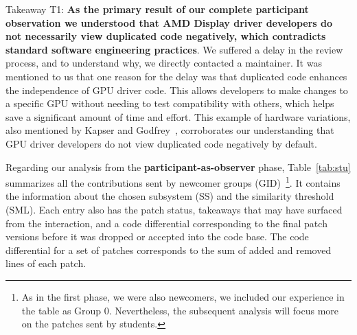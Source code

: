 \documentclass[10pt,conference]{IEEEtran}
\newenvironment{highlight-box}[1]{%
  \begin{tcolorbox}
  \textbf{#1:} \itshape}{\end{tcolorbox}}
\begin{document}
\begin{highlight-box}{Takeaway T1:}
  \textbf{As the primary result of our complete participant observation we
  understood that AMD Display driver developers do not necessarily view
  duplicated code negatively, which contradicts standard software engineering
  practices}. We suffered a delay in the review process, and to understand why,
  we directly contacted a maintainer. It was mentioned to us that one reason for
  the delay was that duplicated code enhances the independence of GPU driver
  code. This allows developers to make changes to a specific GPU without needing
  to test compatibility with others, which helps save a significant amount of
  time and effort. This example of hardware variations, also mentioned by Kapser
  and Godfrey~\cite{cloneharm}, corroborates our understanding that GPU driver
  developers do not view duplicated code negatively by default.
\end{highlight-box}

Regarding our analysis from the \textbf{participant-as-observer} phase, Table~\ref{tab:stu} summarizes all the contributions sent by newcomer groups (GID)~\footnote{As in the first phase, we were also newcomers, we included our experience in the table as Group 0. Nevertheless, the subsequent analysis will focus more on the patches sent by students.}. It contains the information about the chosen subsystem (SS) and the similarity threshold (SML). Each entry also has the patch status, takeaways that may have surfaced from the interaction, and a code differential corresponding to the final patch versions before it was dropped or accepted into the code base. The code differential for a set of patches corresponds to the sum of added and removed lines of each patch.
\end{document}
